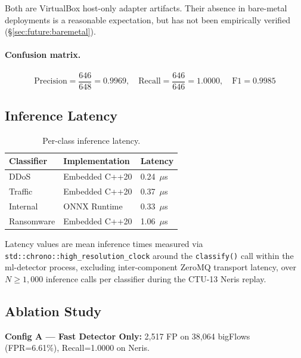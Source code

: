\documentclass[11pt,a4paper]{article}
\begin{document}
    Both are VirtualBox host-only adapter artifacts. Their absence in bare-metal
    deployments is a reasonable expectation, but has not been empirically verified
    (\S\ref{sec:future:baremetal}).

    \paragraph{Confusion matrix.}
    \[
        \text{Precision} = \frac{646}{648} = 0.9969, \quad
        \text{Recall}    = \frac{646}{646} = 1.0000, \quad
        \text{F1}        = 0.9985
    \]

    \subsection{Inference Latency}

    \begin{table}[h]
        \centering
        \caption{Per-class inference latency.}
        \label{tab:latency}
        \begin{tabular}{lll}
            \toprule
            \textbf{Classifier} & \textbf{Implementation} & \textbf{Latency} \\
            \midrule
            DDoS        & Embedded C++20 & 0.24~$\mu$s \\
            Traffic     & Embedded C++20 & 0.37~$\mu$s \\
            Internal    & ONNX Runtime   & 0.33~$\mu$s \\
            Ransomware  & Embedded C++20 & 1.06~$\mu$s \\
            \bottomrule
        \end{tabular}
    \end{table}

    Latency values are mean inference times measured via
    \texttt{std::chrono::high\_resolution\_clock} around the \texttt{classify()} call within the
    ml-detector process, excluding inter-component ZeroMQ transport latency, over $N \geq 1{,}000$
    inference calls per classifier during the CTU-13 Neris replay.

    \subsection{Ablation Study}
    \label{sec:eval:ablation}

    \textbf{Config A --- Fast Detector Only:} 2,517 FP on 38,064 bigFlows (FPR=6.61\%),
    Recall=1.0000 on Neris.
\end{document}
